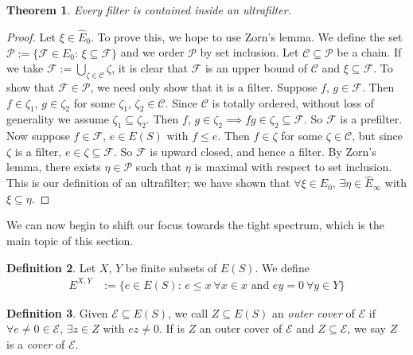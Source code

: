 \documentclass[12pt]{article}
\newtheorem{theorem}{Theorem}[section]
\theoremstyle{definition}
\newtheorem{definition}[theorem]{Definition}
\begin{document}
\begin{theorem} Every filter is contained inside an ultrafilter. \end{theorem}
\begin{proof}
    Let $\xi \in \hat{E}_0$. To prove this, we hope to use Zorn's lemma. We define the set 
    $\mathcal{P} := \{\mathcal{F} \in \hat{E_0} \text{: } \xi \subseteq \mathcal{F}\}$ and 
    we order $\mathcal{P}$ by set inclusion. Let $\mathcal{C} \subseteq \mathcal{P}$ be a chain. 
    If we take $\mathcal{F} := \bigcup_{\zeta \in \mathcal{C}} \zeta$, it is clear that $\mathcal{F}$ is 
    an upper bound of $\mathcal{C}$ and $\xi \subseteq \mathcal{F}$. To show that $\mathcal{F} \in \mathcal{P}$, we
    need only show that it is a filter. Suppose $f$, $g \in \mathcal{F}$. Then $f \in \zeta_1$, $g \in \zeta_2$ for
    some $\zeta_1$, $\zeta_2 \in \mathcal{C}$. Since $\mathcal{C}$ is totally ordered, without loss of generality we
    assume $\zeta_1 \subseteq \zeta_2$. Then $f$, $g \in \zeta_2 \implies fg \in \zeta_2 \subseteq \mathcal{F}$.
    So $\mathcal{F}$ is a prefilter. Now suppose $f \in \mathcal{F}$, $e \in E(S)$ with $f \leq e$. Then $f \in \zeta$ for
    some $\zeta \in \mathcal{C}$, but since $\zeta$ is a filter, $e \in \zeta \subseteq \mathcal{F}$. So $\mathcal{F}$ is
    upward closed, and hence a filter. By Zorn's lemma, there exists $\eta \in \mathcal{P}$ such that $\eta$ is maximal
    with respect to set inclusion. This is our definition of an ultrafilter; we have shown that $\forall \xi \in \hat{E}_0$, $\exists \eta \in \hat{E}_\infty$ with
    $\xi \subseteq \eta$.
\end{proof}

We can now begin to shift our focus towards the tight spectrum, which is the main topic of this section.

\begin{definition} Let $X$, $Y$ be finite subsets of $E(S)$. We define
    \begin{align*} 
        E^{X, Y} &:= \{ e \in E(S) \text{: } e \leq x \ \forall x \in x \text{ and } ey = 0 \ \forall y \in Y \}
    \end{align*}
\end{definition}

\begin{definition}
    Given $\mathcal{E} \subseteq E(S)$, we call $Z \subseteq E(S)$ an \emph{outer cover} of $\mathcal{E}$ if
    $\forall e \neq 0 \in \mathcal{E}$, $\exists z \in Z$ with $ez \neq 0$. If is $Z$ an outer cover of $\mathcal{E}$ 
    and $Z \subseteq \mathcal{E}$, we say $Z$ is a \emph{cover} of $\mathcal{E}$.
\end{definition}
\end{document}
